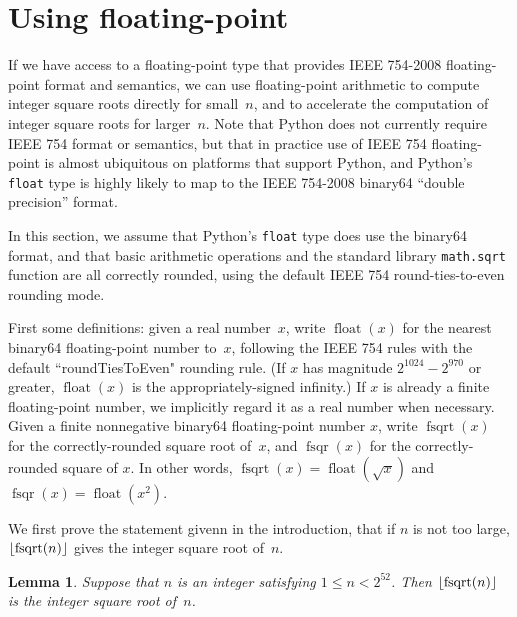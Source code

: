 \documentclass[a4paper]{article}
\DeclarePairedDelimiter\floor{\lfloor}{\rfloor}
\DeclareMathOperator{\fsqrt}{fsqrt}
\DeclareMathOperator{\fsqr}{fsqr}
\DeclareMathOperator{\float}{float}
\theoremstyle{plain}
\newtheorem{lemma}[theorem]{Lemma}
\theoremstyle{definition}
\begin{document}





\section{Using floating-point}

If we have access to a floating-point type that provides IEEE 754-2008
floating-point format and semantics, we can use floating-point arithmetic to
compute integer square roots directly for small~$n$, and to accelerate the
computation of integer square roots for larger~$n$. Note that Python does not
currently require IEEE 754 format or semantics, but that in practice use of
IEEE 754 floating-point is almost ubiquitous on platforms that support Python,
and Python's \lstinline{float} type is highly likely to map to the IEEE
754-2008 binary64 ``double precision'' format.

In this section, we assume that Python's \lstinline{float} type does use
the binary64 format, and that basic arithmetic operations and the standard
library \lstinline{math.sqrt} function are all correctly rounded, using the
default IEEE 754 round-ties-to-even rounding mode.

First some definitions: given a real number~$x$, write $\float(x)$ for the
nearest binary64 floating-point number to~$x$, following the IEEE 754 rules
with the default ``roundTiesToEven" rounding rule. (If $x$ has magnitude
$2^{1024} - 2^{970}$ or greater, $\float(x)$ is the appropriately-signed
infinity.) If $x$ is already a finite floating-point number, we implicitly
regard it as a real number when necessary. Given a finite nonnegative
binary64 floating-point number $x$, write $\fsqrt(x)$ for the correctly-rounded
square root of~$x$, and $\fsqr(x)$ for the correctly-rounded square of $x$. In
other words, $\fsqrt(x) = \float(\sqrt x)$ and $\fsqr(x) = \float(x^2)$.

We first prove the statement givenn in the introduction, that if $n$ is
not too large, $\floor{\fsqrt(n)}$ gives the integer square root of~$n$.

\begin{lemma}
  Suppose that $n$ is an integer satisfying $1 \le n < 2^{52}$. Then
  $\floor{\fsqrt(n)}$ is the integer square root of~$n$.
\end{lemma}
\end{document}
